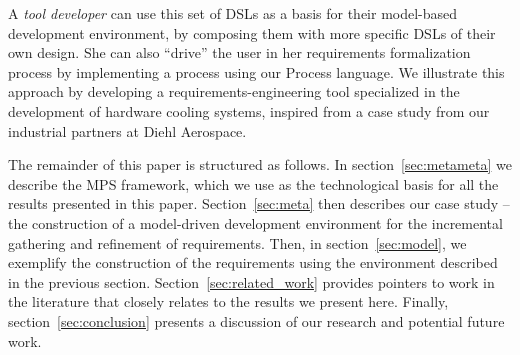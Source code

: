 A \emph{tool developer} can use this set of DSLs as a basis for their
model-based development environment, by composing them with more specific DSLs
of their own design. She can also ``drive'' the user in her requirements
formalization process by implementing a process using our \textsf{Process} language.
We illustrate this approach by developing a requirements-engineering tool
specialized in the development of hardware cooling systems, inspired from a case
study from our industrial partners at Diehl Aerospace.


The remainder of this paper is structured as follows.  In
section~\ref{sec:metameta} we describe the MPS framework, which we use as the
technological basis for all the results presented in this paper.
Section~\ref{sec:meta} then describes our case study -- the construction of a
model-driven development environment for the incremental gathering and
refinement of requirements. Then, in section~\ref{sec:model}, we exemplify the
construction of the requirements using the environment described in the previous
section. Section~\ref{sec:related_work} provides pointers to work in the
literature that closely relates to the results we present here. Finally,
section~\ref{sec:conclusion} presents a discussion of our research and potential
future work.
\vspace{-.5cm}

